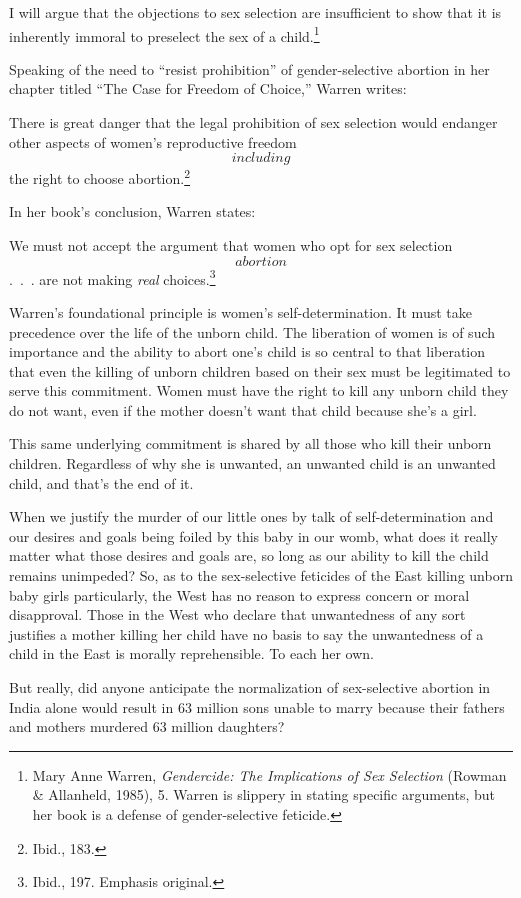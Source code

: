 \documentclass[
]{book}
\begin{document}
I will argue that the objections to sex selection are insufficient to show that it is inherently immoral to preselect the sex of a child.\footnote{Mary Anne Warren, \emph{Gendercide: The Implications of Sex Selection} (Rowman \& Allanheld, 1985), 5. Warren is slippery in stating specific arguments, but her book is a defense of gender-selective feticide.}

Speaking of the need to ``resist prohibition'' of gender-selective abortion in her chapter titled ``The Case for Freedom of Choice,'' Warren writes:

There is great danger that the legal prohibition of sex selection would endanger other aspects of women's reproductive freedom \[including\] the right to choose abortion.\footnote{Ibid., 183.}

In her book's conclusion, Warren states:

We must not accept the argument that women who opt for sex selection \[abortion\] .~.~. are not making \emph{real} choices.\footnote{Ibid., 197. Emphasis original.}

Warren's foundational principle is women's self-determination. It must take precedence over the life of the unborn child. The liberation of women is of such importance and the ability to abort one's child is so central to that liberation that even the killing of unborn children based on their sex must be legitimated to serve this commitment. Women must have the right to kill any unborn child they do not want, even if the mother doesn't want that child because she's a girl.

This same underlying commitment is shared by all those who kill their unborn children. Regardless of why she is unwanted, an unwanted child is an unwanted child, and that's the end of it.

When we justify the murder of our little ones by talk of self-determination and our desires and goals being foiled by this baby in our womb, what does it really matter what those desires and goals are, so long as our ability to kill the child remains unimpeded? So, as to the sex-selective feticides of the East killing unborn baby girls particularly, the West has no reason to express concern or moral disapproval. Those in the West who declare that unwantedness of any sort justifies a mother killing her child have no basis to say the unwantedness of a child in the East is morally reprehensible. To each her own.

But really, did anyone anticipate the normalization of sex-selective abortion in India alone would result in 63 million sons unable to marry because their fathers and mothers murdered 63 million daughters?
\end{document}
